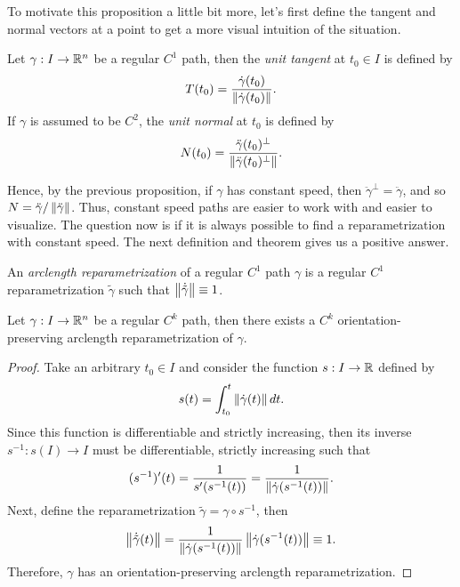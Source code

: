 To motivate this proposition a little bit more, let's first define the tangent and normal vectors at a point to get a more visual intuition of the situation.

\begin{definition}
    Let $\gamma : I \to \mathbb{R}^n$ be a regular $C^1$ path, then the \textit{unit tangent} at $t_0 \in I$ is defined by
    $$T(t_0) = \frac{\dot{\gamma}(t_0)}{\left\lVert\dot{\gamma}(t_0) \right\rVert}.$$
    If $\gamma$ is assumed to be $C^2$, the \textit{unit normal} at $t_0$ is defined by
    $$N(t_0) = \frac{\ddot{\gamma}(t_0)^{\perp}}{\left\lVert\ddot{\gamma}(t_0)^{\perp} \right\rVert}.$$
\end{definition}

Hence, by the previous proposition, if $\gamma$ has constant speed, then $\ddot{\gamma}^{\perp} = \ddot{\gamma}$, and so $N = \ddot{\gamma}/\left\lVert\ddot{\gamma} \right\rVert$. Thus, constant speed paths are easier to work with and easier to visualize. The question now is if it is always possible to find a reparametrization with constant speed. The next definition and theorem gives us a positive answer.

\begin{definition}
    An \textit{arclength reparametrization} of a regular $C^1$ path $\gamma$ is a regular $C^1$ reparametrization $\tilde{\gamma}$ such that $\left\lVert\dot{\tilde{\gamma}} \right\rVert \equiv 1$.
\end{definition}

\begin{proposition}
    Let $\gamma : I \to \mathbb{R}^n$ be a regular $C^k$ path, then there exists a $C^k$ orientation-preserving arclength reparametrization of $\gamma$.
\end{proposition}

\begin{proof}
    Take an arbitrary $t_0 \in I$ and consider the function $s : I \to \mathbb{R}$ defined by
    $$s(t) = \int_{t_0}^t \left\lVert\dot{\gamma}(t) \right\rVert dt.$$
    Since this function is differentiable and strictly increasing, then its inverse $s^{-1} : s(I) \to I$ must be differentiable, strictly increasing such that
    $$(s^{-1})'(t) = \frac{1}{s'(s^{-1}(t))} = \frac{1}{\left\lVert\dot{\gamma}(s^{-1}(t)) \right\rVert}.$$
    Next, define the reparametrization $\tilde{\gamma} = \gamma \circ s^{-1}$, then
    $$\left\lVert\dot{\tilde{\gamma}}(t) \right\rVert = \frac{1}{\left\lVert\dot{\gamma}(s^{-1}(t)) \right\rVert}\left\lVert\dot{\gamma}(s^{-1}(t)) \right\rVert \equiv 1.$$
    Therefore, $\gamma$ has an orientation-preserving arclength reparametrization.
\end{proof}